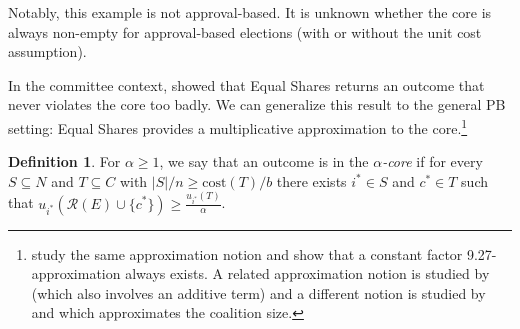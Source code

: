\documentclass[10pt]{scrartcl}
\renewcommand*{\ge}{\geqslant}
\renewcommand*{\geq}{\geqslant}
\newcommand{\myemph}[1]{{\color{winered}\emph{#1}}}
\newcommand{\cost}{{{\mathrm{cost}}}}
\newcommand{\calR}{{{\mathcal{R}}}}
\theoremstyle{definition}
\newtheorem{definition}{Definition}
\theoremstyle{plain}
\begin{document}
Notably, this example is not approval-based. It is unknown whether the core is always non-empty for approval-based elections (with or without the unit cost assumption).

In the committee context, \citet{pet-sko:laminar} showed that Equal Shares returns an outcome that never violates the core too badly.
We can generalize this result to the general PB setting: Equal Shares provides a multiplicative approximation to the core.\footnote{\citet{munagala2022approximate} study the same approximation notion and show that a constant factor 9.27-approximation always exists. A related approximation notion is studied by \citet{fain2018fair} (which also involves an additive term) and a different notion is studied by \citet{cheng2019group} and \citet{jiang2019approx} which approximates the coalition size.} 

\begin{definition}
	For $\alpha \ge 1$, we say that an outcome is in the \myemph{$\alpha$-core} if for every $S \subseteq N$ and $T \subseteq C$ with $|S|/n \geq \cost(T)/b$  there exists $i^* \in S$ and $c^* \in T$ such that $u_{i^*}(\calR(E) \cup \{c^*\}) \geq \frac{u_{i^*}(T)}{\alpha}$.
\end{definition}
\end{document}
